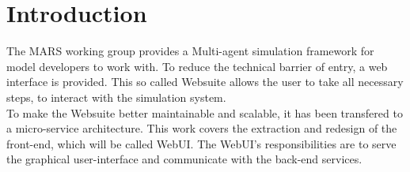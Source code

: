 
\chapter{Introduction}
The MARS working group provides a Multi-agent simulation framework for model developers to work with. To reduce the technical barrier of entry, a web interface is provided. This  so called Websuite allows the user to take all necessary steps, to interact with the simulation system.\\
To make the Websuite better maintainable and scalable, it has been transfered to a micro-service architecture. This work covers the extraction and redesign of the front-end, which will be called WebUI. The WebUI's responsibilities are to serve the graphical user-interface and communicate with the back-end services.
